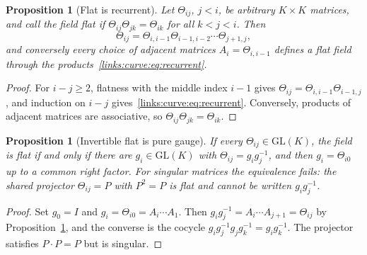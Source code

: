 \documentclass[11pt]{article}
\newtheorem{proposition}[theorem]{Proposition}
\theoremstyle{definition}
\theoremstyle{remark}
\providecommand{\GL}{\mathrm{GL}}
\begin{document}
\begin{proposition}[Flat is recurrent]
\label{links:curve:prop:recurrent}
Let $\Theta_{ij}$, $j<i$, be arbitrary $K\times K$ matrices, and call the field flat if $\Theta_{ij}\Theta_{jk}=\Theta_{ik}$ for all $k<j<i$. Then
\begin{equation}
\Theta_{ij}=\Theta_{i,i-1}\Theta_{i-1,i-2}\cdots\Theta_{j+1,j},
\label{links:curve:eq:recurrent}
\end{equation}
and conversely every choice of adjacent matrices $A_i=\Theta_{i,i-1}$ defines a flat field through the products~\eqref{links:curve:eq:recurrent}.
\end{proposition}

\begin{proof}
For $i-j\ge2$, flatness with the middle index $i-1$ gives $\Theta_{ij}=\Theta_{i,i-1}\Theta_{i-1,j}$, and induction on $i-j$ gives~\eqref{links:curve:eq:recurrent}. Conversely, products of adjacent matrices are associative, so $\Theta_{ij}\Theta_{jk}=\Theta_{ik}$.
\end{proof}

\begin{proposition}[Invertible flat is pure gauge]
\label{links:curve:prop:puregauge}
If every $\Theta_{ij}\in\GL(K)$, the field is flat if and only if there are $g_i\in\GL(K)$ with $\Theta_{ij}=g_ig_j^{-1}$, and then $g_i=\Theta_{i0}$ up to a common right factor. For singular matrices the equivalence fails: the shared projector $\Theta_{ij}=P$ with $P^2=P$ is flat and cannot be written $g_ig_j^{-1}$.
\end{proposition}

\begin{proof}
Set $g_0=I$ and $g_i=\Theta_{i0}=A_i\cdots A_1$. Then $g_ig_j^{-1}=A_i\cdots A_{j+1}=\Theta_{ij}$ by Proposition~\ref{links:curve:prop:recurrent}, and the converse is the cocycle $g_ig_j^{-1}g_jg_k^{-1}=g_ig_k^{-1}$. The projector satisfies $P\cdot P=P$ but is singular.
\end{proof}
\end{document}

